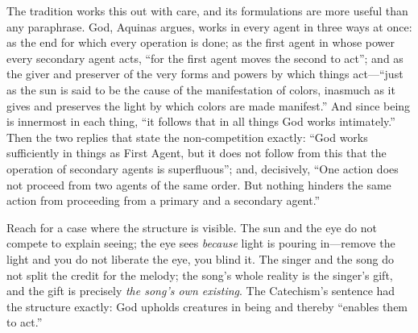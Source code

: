 The tradition works this out with care, and its formulations are more useful than any paraphrase. God, Aquinas argues, works in every agent in three ways at once: as the end for which every operation is done; as the first agent in whose power every secondary agent acts, ``for the first agent moves the second to act''; and as the giver and preserver of the very forms and powers by which things act---``just as the sun is said to be the cause of the manifestation of colors, inasmuch as it gives and preserves the light by which colors are made manifest.'' And since being is innermost in each thing, ``it follows that in all things God works intimately.'' Then the two replies that state the non-competition exactly: ``God works sufficiently in things as First Agent, but it does not follow from this that the operation of secondary agents is superfluous''; and, decisively, ``One action does not proceed from two agents of the same order. But nothing hinders the same action from proceeding from a primary and a secondary agent.''

Reach for a case where the structure is visible. The sun and the eye do not compete to explain seeing; the eye sees \emph{because} light is pouring in---remove the light and you do not liberate the eye, you blind it. The singer and the song do not split the credit for the melody; the song's whole reality is the singer's gift, and the gift is precisely \emph{the song's own existing}. The Catechism's sentence had the structure exactly: God upholds creatures in being and thereby ``enables them to act.''

